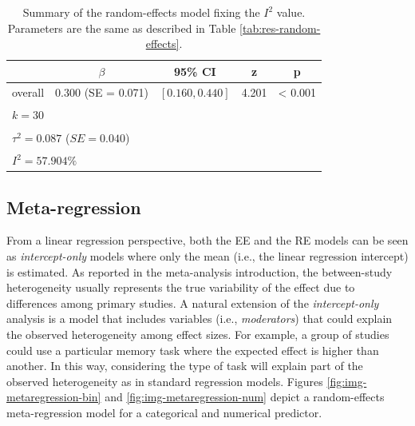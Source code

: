\documentclass[
  man,floatsintext]{apa6}
\begin{document}
\begin{table}[H]

\caption{\label{tab:res-random-effects-i2}Summary of the random-effects model fixing the \(I^2\) value. Parameters are the same as described in Table \ref{tab:res-random-effects}.}
\centering
\fontsize{9}{11}\selectfont
\begin{tabular}[t]{ccccc}
\toprule
 & $\beta$ & 95\% CI & z & p\\
\midrule
overall & 0.300 (SE = 0.071) & $[0.160, 0.440]$ & 4.201 & < 0.001\\
\bottomrule
\multicolumn{5}{l}{\textsuperscript{} $k = 30$}\\
\multicolumn{5}{l}{\textsuperscript{} $\tau^2 = 0.087$ ($SE = 0.040$)}\\
\multicolumn{5}{l}{\textsuperscript{} $I^2 = 57.904\%$}\\
\end{tabular}
\end{table}

\normalsize

\hypertarget{metareg}{%
\subsection{Meta-regression}\label{metareg}}

From a linear regression perspective, both the EE and the RE models can be seen as \emph{intercept-only} models where only the mean (i.e., the linear regression intercept) is estimated. As reported in the meta-analysis introduction, the between-study heterogeneity usually represents the true variability of the effect due to differences among primary studies. A natural extension of the \emph{intercept-only} analysis is a model that includes variables (i.e., \emph{moderators}) that could explain the observed heterogeneity among effect sizes. For example, a group of studies could use a particular memory task where the expected effect is higher than another. In this way, considering the type of task will explain part of the observed heterogeneity as in standard regression models. Figures \ref{fig:img-metaregression-bin} and \ref{fig:img-metaregression-num} depict a random-effects meta-regression model for a categorical and numerical predictor.

\scriptsize
\end{document}
